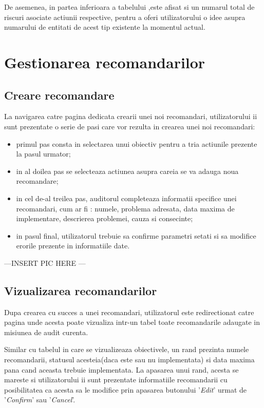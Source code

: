 De asemenea, in partea inferioara a tabelului ,este afisat si un numarul total de riscuri asociate actiunii respective, pentru a oferi utilizatorului o idee asupra numarului de entitati de acest tip existente la momentul actual. 



\section{Gestionarea recomandarilor}

\subsection*{Creare recomandare}
La navigarea catre pagina dedicata crearii unei noi recomandari, utilizatorului ii sunt prezentate o serie de pasi care vor rezulta in crearea unei noi recomandari:
	
	\begin{itemize}
		\item primul pas consta in selectarea unui obiectiv pentru a tria actiunile prezente la pasul urmator;
		
		\item in al doilea pas se selecteaza actiunea asupra careia se va adauga noua recomandare;
		
		\item in cel de-al treilea pas, auditorul completeaza informatii specifice unei recomandari, cum ar fi : numele, problema adresata, data maxima de implementare, descrierea problemei, cauza si consecinte;
		
		\item in pasul final, utilizatorul trebuie sa confirme parametri setati si sa modifice erorile prezente in informatiile date.
	\end{itemize}

---INSERT PIC HERE --- 


\subsection*{Vizualizarea recomandarilor}

Dupa crearea cu succes a unei recomandari, utilizatorul este redirectionat catre pagina unde acesta poate vizualiza intr-un tabel toate recomandarile adaugate in misiunea de audit curenta.

Similar cu tabelul in care se vizualizeaza obiectivele, un rand prezinta numele recomandarii, statusul acesteia(daca este sau nu implementata) si data maxima pana cand aceasta trebuie implementata. La apasarea unui rand, acesta se mareste si utilizatorului ii sunt prezentate informatiile recomandarii cu posibilitatea ca acesta sa le modifice prin apasarea butonului '\textit{Edit}' urmat de '\textit{Confirm}' sau '\textit{Cancel}'.

